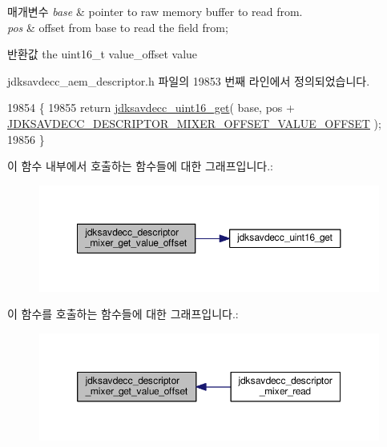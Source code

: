 \begin{DoxyParams}{매개변수}
{\em base} & pointer to raw memory buffer to read from. \\
\hline
{\em pos} & offset from base to read the field from; \\
\hline
\end{DoxyParams}
\begin{DoxyReturn}{반환값}
the uint16\+\_\+t value\+\_\+offset value 
\end{DoxyReturn}


jdksavdecc\+\_\+aem\+\_\+descriptor.\+h 파일의 19853 번째 라인에서 정의되었습니다.


\begin{DoxyCode}
19854 \{
19855     \textcolor{keywordflow}{return} \hyperlink{group__endian_ga3fbbbc20be954aa61e039872965b0dc9}{jdksavdecc\_uint16\_get}( base, pos + 
      \hyperlink{group__descriptor__mixer_gabb5a4b78adada52a77365021773ae1dd}{JDKSAVDECC\_DESCRIPTOR\_MIXER\_OFFSET\_VALUE\_OFFSET} );
19856 \}
\end{DoxyCode}


이 함수 내부에서 호출하는 함수들에 대한 그래프입니다.\+:
\nopagebreak
\begin{figure}[H]
\begin{center}
\leavevmode
\includegraphics[width=350pt]{group__descriptor__mixer_gaa5c0ba55c141e621e25459ae9e779145_cgraph}
\end{center}
\end{figure}




이 함수를 호출하는 함수들에 대한 그래프입니다.\+:
\nopagebreak
\begin{figure}[H]
\begin{center}
\leavevmode
\includegraphics[width=350pt]{group__descriptor__mixer_gaa5c0ba55c141e621e25459ae9e779145_icgraph}
\end{center}
\end{figure}


